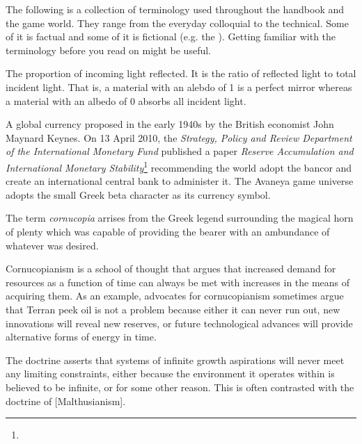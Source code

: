 

The following is a collection of terminology used throughout the handbook and the game world. They range from the everyday colloquial to the technical. Some of it is factual and some of it is fictional (e.g. the {\it \about[Jenya]}). Getting familiar with the terminology before you read on might be useful.

The proportion of incoming light reflected. It is the ratio of reflected light to total incident light. That is, a material with an alebdo of 1 is a perfect mirror whereas a material with an albedo of 0 absorbs all incident light.

A global currency proposed in the early 1940s by the British economist John Maynard Keynes. On 13 April 2010, the {\it Strategy, Policy and Review Department of the International Monetary Fund} published a paper {\it Reserve Accumulation and International Monetary Stability}\footnote{} recommending the world adopt the bancor and create an international central bank to administer it. The Avaneya game universe adopts the small Greek beta character  as its currency symbol.

The term {\it cornucopia} arrises from the Greek legend surrounding the magical horn of plenty which was capable of providing the bearer with an ambundance of whatever was desired.

Cornucopianism is a school of thought that argues that increased demand for resources as a function of time can always be met with increases in the means of acquiring them. As an example, advocates for cornucopianism sometimes argue that Terran peek oil is not a problem because either it can never run out, new innovations will reveal new reserves, or future technological advances will provide alternative forms of energy in time. 

The doctrine asserts that systems of infinite growth aspirations will never meet any limiting constraints, either because the environment it operates within is believed to be infinite, or for some other reason. This is often contrasted with the doctrine of [Malthusianism].

